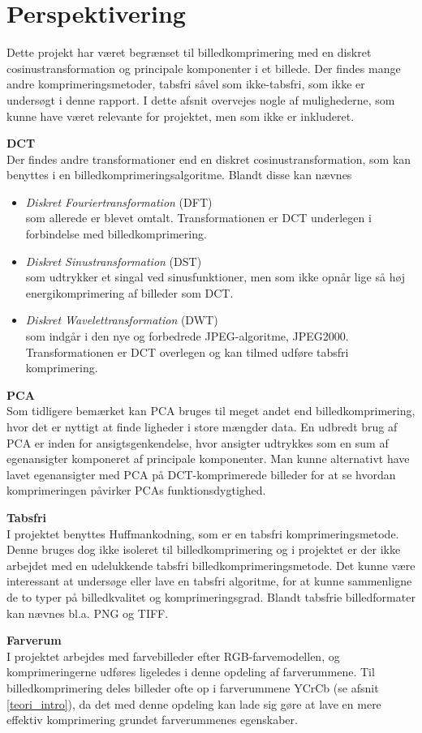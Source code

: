 \chapter{Perspektivering}
Dette projekt har været begrænset til billedkomprimering med en diskret cosinustransformation og principale komponenter i et billede. Der findes mange andre komprimeringsmetoder, tabsfri såvel som ikke-tabsfri, som ikke er undersøgt i denne rapport. I dette afsnit overvejes nogle af mulighederne, som kunne have været relevante for projektet, men som ikke er inkluderet.

\textbf{DCT}\\
Der findes andre transformationer end en diskret cosinustransformation, som kan benyttes i en billedkomprimeringsalgoritme. Blandt disse kan nævnes
\begin{itemize}
	\item[]{\textit{Diskret Fouriertransformation} (DFT)\\
	som allerede er blevet omtalt. Transformationen er DCT underlegen i forbindelse med billedkomprimering.}\\
	\item[]{\textit{Diskret Sinustransformation} (DST)\\
	som udtrykker et singal ved sinusfunktioner, men som ikke opnår lige så høj energikomprimering af billeder som DCT.}\\
	\item[]{\textit{Diskret Wavelettransformation} (DWT)\\
	som indgår i den nye og forbedrede JPEG-algoritme, JPEG2000. Transformationen er DCT overlegen og kan tilmed udføre tabsfri komprimering.}
\end{itemize}

\textbf{PCA}\\
Som tidligere bemærket kan PCA bruges til meget andet end billedkomprimering, hvor det er nyttigt at finde ligheder i store mængder data. En udbredt brug af PCA er inden for ansigtsgenkendelse, hvor ansigter udtrykkes som en sum af egenansigter komponeret af principale komponenter. Man kunne alternativt have lavet egenansigter med PCA på DCT-komprimerede billeder for at se hvordan komprimeringen påvirker PCAs funktionsdygtighed.

\textbf{Tabsfri}\\
I projektet benyttes Huffmankodning, som er en tabsfri komprimeringsmetode. Denne bruges dog ikke isoleret til billedkomprimering og i projektet er der ikke arbejdet med en udelukkende tabsfri billedkomprimeringsmetode. Det kunne være interessant at undersøge eller lave en tabsfri algoritme, for at kunne sammenligne de to typer på billedkvalitet og komprimeringsgrad. Blandt tabsfrie billedformater kan nævnes bl.a. PNG og TIFF.

\textbf{Farverum}\\
I projektet arbejdes med farvebilleder efter RGB-farvemodellen, og komprimeringerne udføres ligeledes i denne opdeling af farverummene. Til billedkomprimering deles billeder ofte op i farverummene YCrCb (se afsnit \vref{teori_intro}), da det med denne opdeling kan lade sig gøre at lave en mere effektiv komprimering grundet farverummenes egenskaber.